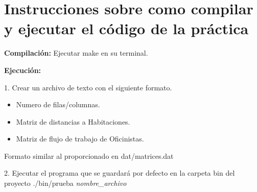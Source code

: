 \documentclass[11pt, a4paper]{article}
\theoremstyle{theorem-style}
\theoremstyle{definition-style}
\theoremstyle{remark-style}
\theoremstyle{example-style}
\begin{document}
\section{Instrucciones sobre como compilar y ejecutar el código de la práctica}

\textbf{Compilación:} Ejecutar make en su terminal.


\textbf{Ejecución:} 


1. Crear un archivo de texto con el siguiente formato.
\begin{itemize}
\item Numero de filas/columnas. 
\item Matriz de distancias a Habitaciones.
\item Matriz de flujo de trabajo de Oficinistas.
\end{itemize}
Formato similar al proporcionado en dat/matrices.dat


2. Ejecutar el programa que se guardará por defecto en la carpeta
bin del proyecto ./bin/prueba \textit{nombre\_archivo}
\end{document}
